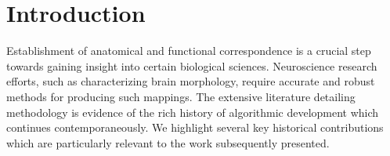 \documentclass{frontiersSCNS}
\begin{document}
%
%
%







\section{Introduction}

Establishment of anatomical and functional correspondence
is a crucial step towards gaining insight into certain biological
sciences.  Neuroscience research efforts, such as characterizing
brain morphology, require accurate and robust methods for
producing such mappings.  The
extensive literature detailing methodology is evidence of the rich history of
algorithmic development which continues contemporaneously.
We highlight several key historical contributions which are particularly relevant to the work 
subsequently presented.
\end{document}
